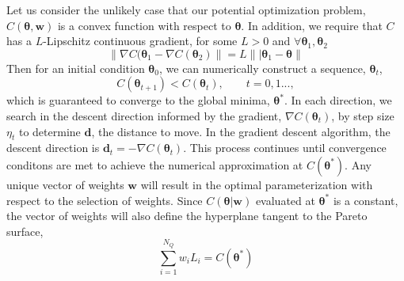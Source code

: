 
Let us consider the unlikely case that our potential optimization problem, $C(\bm{\theta},\bm{w})$ is a convex function with respect to $\bm{\theta}$.  In addition, we require that $C$ has a $L$-Lipschitz continuous gradient, for some $L > 0$ and $\forall \bm{\theta}_1, \bm{\theta}_2$
\begin{equation}
	\lVert \nabla C(\bm{\theta}_1 - \nabla C(\bm{\theta}_2) \rVert
	= L \lVert| \bm{\theta}_1 - \bm{\theta} \rVert
\end{equation}
Then for an initial condition $\bm{\theta}_0$, we can numerically construct a sequence, ${\bm{\theta}_t}$,
\begin{equation}
	C(\bm{\theta}_{t+1}) < C(\bm{\theta}_{t}), \qquad t = 0,1...,
\end{equation}
which is guaranteed to converge to the global minima, $\bm{\theta}^*$.
In each direction, we search in the descent direction informed by the gradient, $\nabla C(\bm{\theta}_t)$, by step size $\eta_t$ to determine $\bm{d}$, the distance to move.  In the gradient descent algorithm, the descent direction is $\bm{d}_t = - \nabla C(\bm{\theta}_t)$.  This process continues until convergence conditons are met to achieve the numerical approximation at $C(\bm{\theta}^*)$.  Any unique vector of weights $\bm{w}$ will result in the optimal parameterization with respect to the selection of weights.  Since $C(\bm{\theta}|\bm{w})$ evaluated at $\bm{\theta}^*$ is a constant, the vector of weights will also define the hyperplane tangent to the Pareto surface,
\begin{equation}
	\sum_{i=1}^{N_Q} w_i L_i = C(\bm{\theta}^*)
\end{equation}

